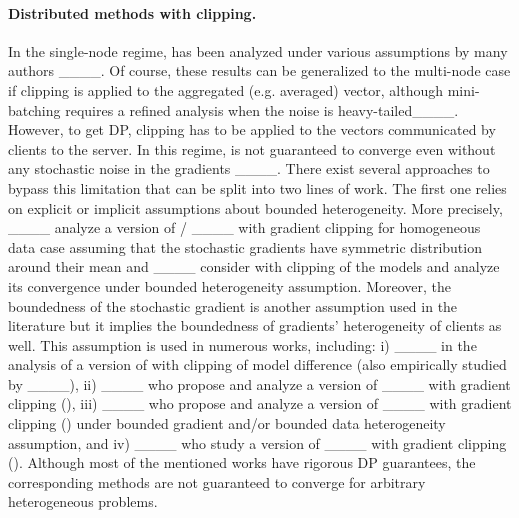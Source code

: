\paragraph{Distributed methods with clipping.} In  the single-node regime,  has been analyzed under various assumptions by many authors ____. Of course, these results can be generalized to the multi-node case if clipping is applied to the aggregated (e.g. averaged) vector, although mini-batching requires a refined analysis when the noise is heavy-tailed____. However, to get DP, clipping has to be applied to the vectors communicated by clients to the server. In this regime,  is not guaranteed to converge even without any stochastic noise in the gradients ____. There exist several approaches to bypass this limitation that can be split into two lines of work. The first one relies on explicit or implicit assumptions about bounded heterogeneity. More precisely, ____ analyze a version of / ____ with gradient clipping for homogeneous data case assuming that the stochastic gradients have symmetric distribution around their mean and ____ consider  with clipping of the models and analyze its convergence under bounded heterogeneity assumption. Moreover, the boundedness of the stochastic gradient is another assumption used in the literature but it implies the boundedness of gradients' heterogeneity of clients as well. This assumption is used in numerous works, including: i) ____ in the analysis of a version of  with clipping of model difference (also empirically studied by ____), ii) ____ who propose and analyze a version of  ____ with gradient clipping (), iii) ____ who propose and analyze a version of  ____ with gradient clipping () under bounded gradient and/or bounded data heterogeneity assumption, and iv) ____ who study a version of  ____ with gradient clipping (). Although most of the mentioned works have rigorous DP guarantees, the corresponding methods are not guaranteed to converge for arbitrary heterogeneous problems. 

